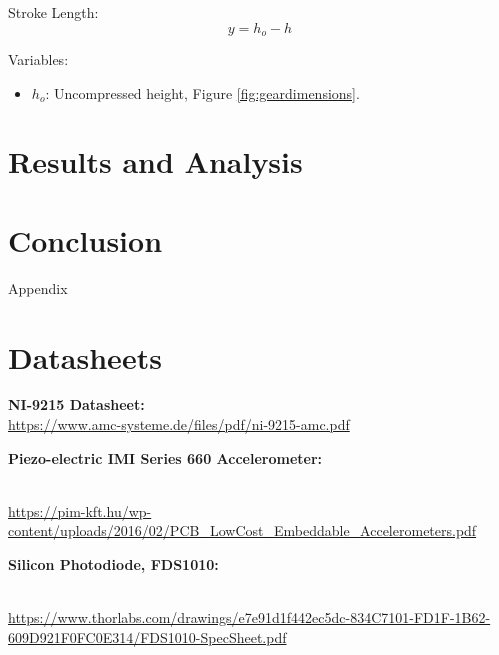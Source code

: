 \documentclass{article}
\begin{document}
Stroke Length:
\begin{equation}
    y = h_{o} - h
\end{equation}

Variables:
\begin{itemize}
    \item \(h_{o}\): Uncompressed height, Figure \ref{fig:geardimensions}. 
\end{itemize}
\vspace{5mm}
\section{Results and Analysis}

 
\section{Conclusion}



\newpage
\thispagestyle{empty}  %
\begin{center}
	\vspace*{\fill}
	{\Huge Appendix}
	\vspace*{\fill}
\end{center}

\newpage
\begin{appendices}
\pagestyle{fancy}
\renewcommand{\thefigure}{A\arabic{figure}}
\setcounter{figure}{0}



\pagebreak

\hypertarget{datasheets}{}
\section{Datasheets}
\begin{enumerate}[label = {[\arabic*]}]
\small
\item \textbf{NI-9215 Datasheet:}\\[2pt] \url{https://www.amc-systeme.de/files/pdf/ni-9215-amc.pdf}
\item \hypertarget{2}{\textbf{Piezo-electric IMI Series 660 Accelerometer:}}\\[2pt] \url{https://pim-kft.hu/wp-content/uploads/2016/02/PCB_LowCost_Embeddable_Accelerometers.pdf}
\item \hypertarget{3}{\textbf{Silicon Photodiode, FDS1010:}}\\[2pt] \url{https://www.thorlabs.com/drawings/e7e91d1f442ec5dc-834C7101-FD1F-1B62-609D921F0FC0E314/FDS1010-SpecSheet.pdf}


\end{enumerate}

\end{appendices}
\end{document}
